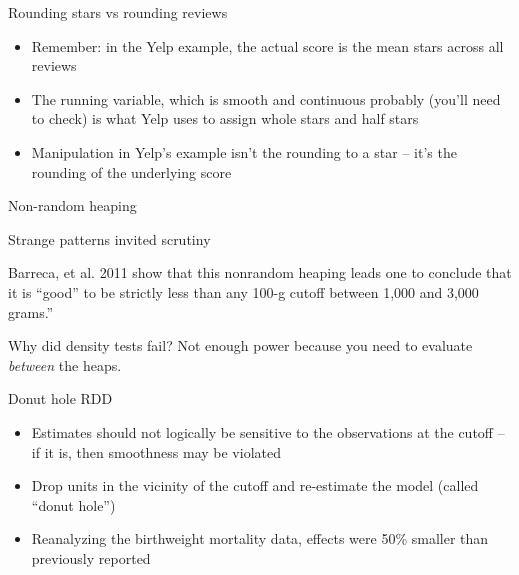 \documentclass{beamer}
\begin{document}
\begin{frame}{Rounding stars vs rounding reviews}

\begin{itemize}
\item Remember: in the Yelp example, the actual score is the mean stars across all reviews
\item The running variable, which is smooth and continuous probably (you'll need to check) is what Yelp uses to assign whole stars and half stars
\item Manipulation in Yelp's example isn't the rounding to a star -- it's the rounding of the underlying score
\end{itemize}

\end{frame}


\begin{frame}{Non-random heaping}

Strange patterns invited scrutiny

\bigskip

Barreca, et al. 2011 show that this nonrandom heaping leads one to conclude that it is ``good'' to be strictly less than any 100-g cutoff between 1,000 and 3,000 grams.''

\bigskip

Why did density tests fail? Not enough power because you need to evaluate \emph{between} the heaps.

\end{frame}



\begin{frame}{Donut hole RDD}

\begin{itemize}
\item Estimates should not logically be sensitive to the observations at the cutoff -- if it is, then smoothness may be violated
\item Drop units in the vicinity of the cutoff and re-estimate the model (called ``donut hole'')
\item Reanalyzing the birthweight mortality data, effects were 50\% smaller than previously reported
\end{itemize}

\end{frame}
\end{document}
